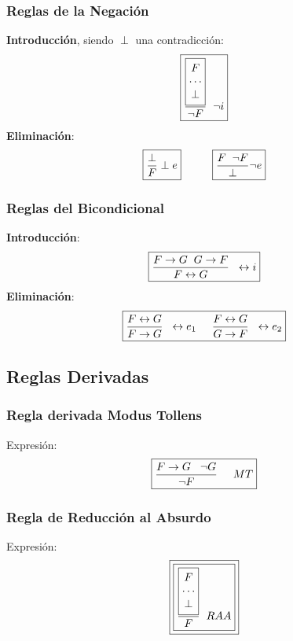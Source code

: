\subsubsection{Reglas de la Negación}
\noindent \textbf{Introducción}, siendo \(\perp\) una contradicción:
\[
        \boxed{\frac{\boxed{\begin{matrix}
                                        F      \\
                                        \cdots \\
                                        \perp
                                \end{matrix}}}{\neg F} \hspace{2mm}\neg i}\]
\noindent \textbf{Eliminación}:
\[
        \boxed{\frac{\perp }{F} \perp e} \hspace{1cm} \boxed{\frac{F \hspace{2mm}\neg F}{\perp} \neg e}
\]
\subsubsection{Reglas del Bicondicional}
\noindent \textbf{Introducción}:
\[
        \boxed{\frac{F \rightarrow G \hspace{2mm} G \rightarrow F}{F \leftrightarrow G} \hspace{2mm} \leftrightarrow i}
\]
\noindent \textbf{Eliminación}:
\[\boxed{\frac{F \leftrightarrow G}{F \rightarrow G} \hspace{2mm} \leftrightarrow e_1 \hspace{5mm} \frac{F \leftrightarrow G}{G \rightarrow F} \hspace{2mm} \leftrightarrow e_2}
\]
\subsection{Reglas Derivadas}
\subsubsection{Regla derivada Modus Tollens}
\noindent Expresión:
\[
        \boxed{\frac{F\rightarrow G \hspace{3mm} \neg G}{\neg F} \hspace{5mm} MT}\]
\subsubsection{Regla de Reducción al Absurdo}
\noindent Expresión:
\[
        \boxed{\boxed{\frac{\boxed{\begin{matrix}
                                                F      \\
                                                \cdots \\
                                                \perp
                                        \end{matrix}}}{F} \hspace{2mm}RAA
                }}
\]


